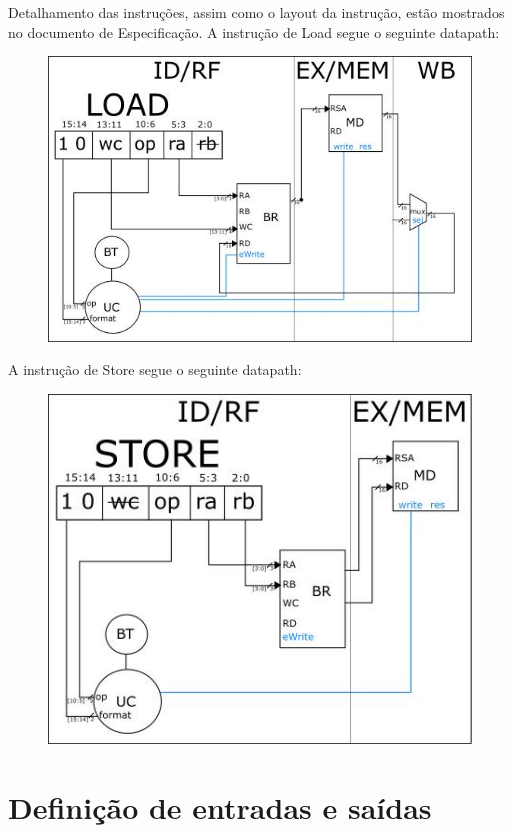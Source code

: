 \documentclass{article}
\begin{document}
  \newpage
  Detalhamento das instruções, assim como o layout da instrução, estão mostrados no documento de Especificação.
  A instrução de Load segue o seguinte datapath:
  \begin{figure}[H]
	\centering
	\includegraphics[scale=0.8]{./pictures/load.png}
\end{figure}  
\newpage
A instrução de Store segue o seguinte datapath:
\begin{figure}[H]
	\centering
	\includegraphics[scale=0.8]{./pictures/store.png}
\end{figure}  
  
  
  \newpage
  
  
  
\section{Definição de entradas e saídas}
\end{document}
